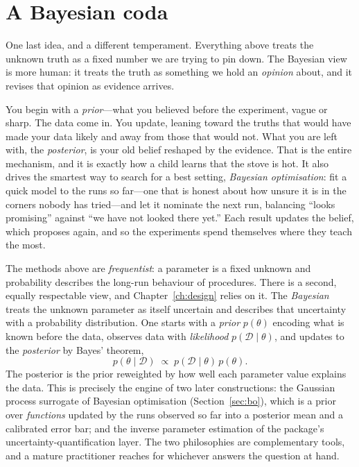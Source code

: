 \section{A Bayesian coda}
\label{sec:stats-bayes}

One last idea, and a different temperament. Everything above treats the unknown
truth as a fixed number we are trying to pin down. The Bayesian view is more
human: it treats the truth as something we hold an \emph{opinion} about, and it
revises that opinion as evidence arrives.

You begin with a \emph{prior}---what you believed before the experiment, vague or
sharp. The data come in. You update, leaning toward the truths that would have
made your data likely and away from those that would not. What you are left with,
the \emph{posterior}, is your old belief reshaped by the evidence. That is the
entire mechanism, and it is exactly how a child learns that the stove is hot. It
also drives the smartest way to search for a best setting, \emph{Bayesian
optimisation}: fit a quick model to the runs so far---one that is honest about
how unsure it is in the corners nobody has tried---and let it nominate the next
run, balancing ``looks promising'' against ``we have not looked there yet.'' Each
result updates the belief, which proposes again, and so the experiments spend
themselves where they teach the most.

The methods above are \emph{frequentist}: a parameter is a fixed unknown and
probability describes the long-run behaviour of procedures. There is a second,
equally respectable view, and Chapter~\ref{ch:design} relies on it. The
\emph{Bayesian} treats the unknown parameter as itself uncertain and describes
that uncertainty with a probability distribution. One starts with a \emph{prior}
$p(\theta)$ encoding what is known before the data, observes data with
\emph{likelihood} $p(\mathcal D\mid\theta)$, and updates to the \emph{posterior}
by Bayes' theorem,
%
\begin{equation}
p(\theta\mid\mathcal D)\;\propto\; p(\mathcal D\mid\theta)\,p(\theta).
\label{eq:bayes}
\end{equation}
%
The posterior is the prior reweighted by how well each parameter value explains
the data. This is precisely the engine of two later constructions: the Gaussian
process surrogate of Bayesian optimisation (Section~\ref{sec:bo}), which is a
prior over \emph{functions} updated by the runs observed so far into a posterior
mean and a calibrated error bar; and the inverse parameter estimation of the
package's uncertainty-quantification layer. The two philosophies are
complementary tools, and a mature practitioner reaches for whichever answers the
question at hand.

